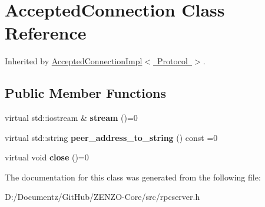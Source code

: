 \hypertarget{class_accepted_connection}{}\section{Accepted\+Connection Class Reference}
\label{class_accepted_connection}


Inherited by \mbox{\hyperlink{class_accepted_connection_impl}{Accepted\+Connection\+Impl$<$ Protocol $>$}}.

\subsection*{Public Member Functions}
\begin{DoxyCompactItemize}
\item 
\mbox{\label{class_accepted_connection_a2072a12e4d8f1b79a67bc86903400a0e}} 
virtual std\+::iostream \& {\bfseries stream} ()=0
\item 
\mbox{\label{class_accepted_connection_adb2d35d48527a90078833f85249f2a56}} 
virtual std\+::string {\bfseries peer\+\_\+address\+\_\+to\+\_\+string} () const =0
\item 
\mbox{\label{class_accepted_connection_a819d5373c0d62e736fd6e0027daa2893}} 
virtual void {\bfseries close} ()=0
\end{DoxyCompactItemize}


The documentation for this class was generated from the following file\+:\begin{DoxyCompactItemize}
\item 
D\+:/\+Documentz/\+Git\+Hub/\+Z\+E\+N\+Z\+O-\/\+Core/src/rpcserver.\+h\end{DoxyCompactItemize}
